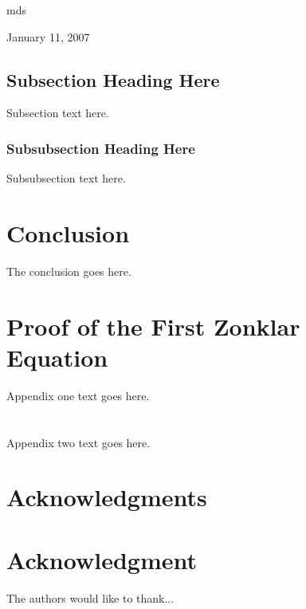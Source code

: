 \documentclass[12pt,journal,compsoc]{IEEEtran}
\begin{document}
\hfill mds
 
\hfill January 11, 2007

\subsection{Subsection Heading Here}
Subsection text here.



\subsubsection{Subsubsection Heading Here}
Subsubsection text here.

















\section{Conclusion}
The conclusion goes here.










\appendices
\section{Proof of the First Zonklar Equation}
Appendix one text goes here.

\section{}
Appendix two text goes here.


\ifCLASSOPTIONcompsoc
\section*{Acknowledgments}
\else
\section*{Acknowledgment}
\fi


The authors would like to thank...


\ifCLASSOPTIONcaptionsoff
  \newpage
\fi
\end{document}
